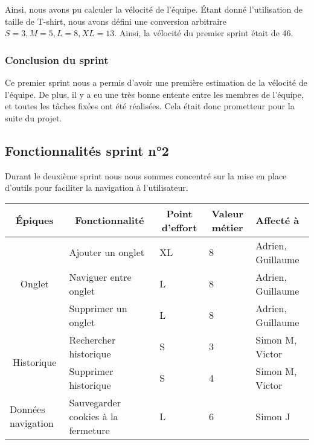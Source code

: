 \documentclass[10pt,a4paper]{article}
\begin{document}
Ainsi, nous avons pu calculer la vélocité de l'équipe. Étant donné l'utilisation de taille de T-shirt, nous avons défini une conversion arbitraire $S = 3, M = 5, L = 8, XL = 13$. Ainsi, la vélocité du premier sprint était de 46.

\subsubsection{Conclusion du sprint}
Ce premier sprint nous a permis d'avoir une première estimation de la vélocité de l'équipe. De plus, il y a eu une très bonne entente entre les membres de l'équipe, et toutes les tâches fixées ont été réalisées. Cela était donc prometteur pour la suite du projet.


\subsection{Fonctionnalités sprint n°2}
Durant le deuxième sprint nous nous sommes concentré sur la mise en place d'outils pour faciliter la navigation à l'utilisateur. 

\begin{table}[h]
\begin{tabular}{|c|l|l|l|l|}
\hline
\textbf{Épiques}                            & \multicolumn{1}{c|}{\textbf{Fonctionnalité}} & \multicolumn{1}{c|}{\textbf{Point d'effort}} & \multicolumn{1}{c|}{\textbf{Valeur métier}} & \textbf{Affecté à} \\ \hline
\multirow{3}{*}{Onglet}                  & Ajouter un onglet                            & XL                                           & 8                                           & Adrien, Guillaume  \\ \cline{2-5} 
                                         & Naviguer entre onglet                        & L                                            & 8                                           & Adrien, Guillaume  \\ \cline{2-5} 
                                         & Supprimer un onglet                          & L                                            & 8                                           & Adrien, Guillaume  \\ \hline
\multirow{2}{*}{Historique}              & Rechercher historique                        & S                                            & 3                                           & Simon M, Victor    \\ \cline{2-5} 
                                         & Supprimer historique                         & S                                            & 4                                           & Simon M, Victor    \\ \hline
\multicolumn{1}{|l|}{Données navigation} & Sauvegarder cookies à la fermeture           & L                                            & 6                                           & Simon J            \\ \hline
\end{tabular}
\end{table}
\end{document}
